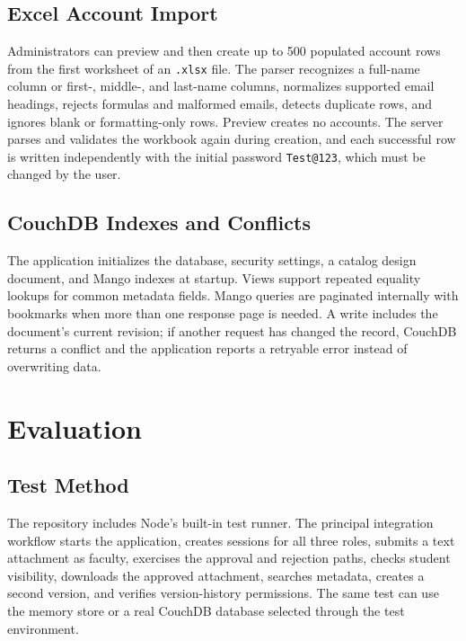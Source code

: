 \documentclass[conference]{IEEEtran}
\begin{document}
\subsection{Excel Account Import}
Administrators can preview and then create up to 500 populated account rows from the first worksheet of an \texttt{.xlsx} file. The parser recognizes a full-name column or first-, middle-, and last-name columns, normalizes supported email headings, rejects formulas and malformed emails, detects duplicate rows, and ignores blank or formatting-only rows. Preview creates no accounts. The server parses and validates the workbook again during creation, and each successful row is written independently with the initial password \texttt{Test@123}, which must be changed by the user.

\subsection{CouchDB Indexes and Conflicts}
The application initializes the database, security settings, a catalog design document, and Mango indexes at startup. Views support repeated equality lookups for common metadata fields. Mango queries are paginated internally with bookmarks when more than one response page is needed. A write includes the document's current revision; if another request has changed the record, CouchDB returns a conflict and the application reports a retryable error instead of overwriting data.

\section{Evaluation}

\subsection{Test Method}
The repository includes Node's built-in test runner. The principal integration workflow starts the application, creates sessions for all three roles, submits a text attachment as faculty, exercises the approval and rejection paths, checks student visibility, downloads the approved attachment, searches metadata, creates a second version, and verifies version-history permissions. The same test can use the memory store or a real CouchDB database selected through the test environment.
\end{document}

